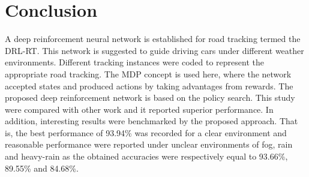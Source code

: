 \documentclass{svproc}
\begin{document}
\section{Conclusion}
A deep reinforcement neural network is established for road tracking termed the DRL-RT. This network is suggested to guide driving cars under different weather environments. Different tracking instances were coded to represent the appropriate road tracking. The MDP concept is used here, where the network accepted states and produced actions by taking advantages from rewards. The proposed deep reinforcement network is based on the policy search. This study were compared with other work and it reported superior performance. In addition, interesting results were benchmarked by the proposed approach. That is, the best performance of 93.94\% was recorded for a clear environment and reasonable performance were reported under unclear environments of fog, rain and heavy-rain as the obtained accuracies were respectively equal to 93.66\%, 89.55\% and 84.68\%. 
%
%
%
%

 
\end{document}
